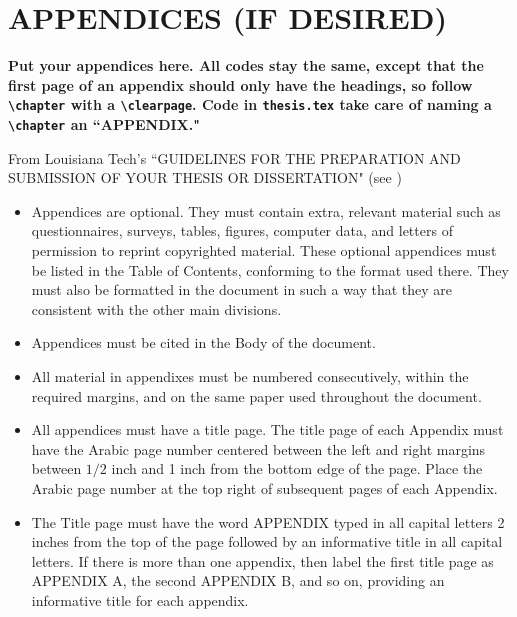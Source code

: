 
\chapter{APPENDICES (IF DESIRED)}\label{append1}

\clearpage

{\bf Put your appendices here. All codes stay the same, except that 
the first page of an appendix should only have the 
headings, so follow \verb+\chapter+ with a 
\verb+\clearpage+. Code in \verb+thesis.tex+
take care of naming a \verb+\chapter+ an ``APPENDIX."}

From Louisiana Tech's
``GUIDELINES FOR THE
PREPARATION AND SUBMISSION
OF YOUR THESIS OR DISSERTATION"
(see \cite{guide})



\begin{itemize}
\item
Appendices are optional. They must contain extra, relevant material such as
questionnaires, surveys, tables, figures, computer data, and letters of permission
to reprint copyrighted material. These optional appendices must be listed in the
Table of Contents, conforming to the format used there. They must also be
formatted in the document in such a way that they are consistent with the other
main divisions.
\item
Appendices must be cited in the Body of the document.
\item
All material in appendixes must be numbered consecutively, within the required
margins, and on the same paper used throughout the document.
\item
All appendices must have a title page. The title page of each Appendix must have
the Arabic page number centered between the left and right margins between $1/2$
inch and 1 inch from the bottom edge of the page. Place the Arabic page number
at the top right of subsequent pages of each Appendix.
\item
The Title page must have the word APPENDIX typed in all capital letters 2
inches from the top of the page followed by an informative title in all capital
letters. If there is more than one appendix, then label the first title page as
APPENDIX A, the second APPENDIX B, and so on, providing an
informative title for each appendix.
\end{itemize}